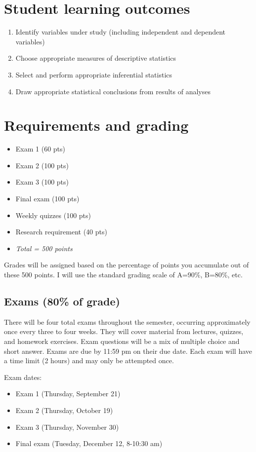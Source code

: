 \documentclass[10pt]{article}
\begin{document}
\section*{Student learning outcomes}
\label{sec-4}
\begin{enumerate}
\item Identify variables under study (including independent and dependent variables)
\item Choose appropriate measures of descriptive statistics
\item Select and perform appropriate inferential statistics
\item Draw appropriate statistical conclusions from results of analyses
\end{enumerate}

\section*{Requirements and grading}
\label{sec-5}
\begin{itemize}
\item Exam 1 (60 pts)
\item Exam 2 (100 pts)
\item Exam 3 (100 pts)
\item Final exam (100 pts)
\item Weekly quizzes (100 pts)
\item Research requirement (40 pts)
\item \emph{Total = 500 points}
\end{itemize}

Grades will be assigned based on the percentage of points you accumulate out of these 500 points.  I will use the standard grading scale of A=90\%, B=80\%, etc.

\subsection*{Exams (80\% of grade)}
\label{sec-5-1}
There will be four total exams throughout the semester, occurring approximately once every three to four weeks.  They will cover material from lectures, quizzes, and homework exercises.  Exam questions will be a mix of multiple choice and short answer.  Exams are due by 11:59 pm on their due date.  Each exam will have a time limit (2 hours) and may only be attempted once.

Exam dates:

\begin{itemize}
\item Exam 1 (Thursday, September 21)
\item Exam 2 (Thursday, October 19)
\item Exam 3 (Thursday, November 30)
\item Final exam (Tuesday, December 12, 8-10:30 am)
\end{itemize}
\end{document}
